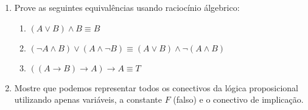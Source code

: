 \documentclass[11pt,a4paper]{report}
\begin{document}
\begin{enumerate}
	\item Prove as seguintes equival\^encias usando racioc\'inio \'algebrico:
	\begin{enumerate}
		\item $(A\lor B)\land B\equiv B$
		\item $(\neg A\land B)\lor (A\land\neg B)\equiv (A\lor B)\land \neg (A\land B)$
		\item $((A\rightarrow B)\rightarrow A)\rightarrow A\equiv T$
	\end{enumerate}
        \item Mostre que podemos representar todos os conectivos da
          l\'ogica proposicional utilizando apenas vari\'aveis, a
          constante $F$ (falso) e o conectivo de implica\c{c}\~ao.
\end{enumerate}
\end{document}
